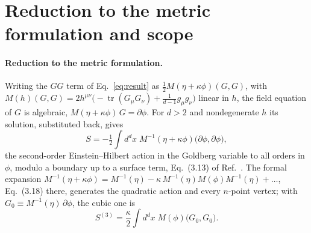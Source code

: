 \documentclass[prd,aps,preprint,superscriptaddress,nofootinbib,amsmath,amssymb,eqsecnum]{revtex4-2}
\providecommand{\DIFaddtex}[1]{{\protect\color{blue} \sf #1}} %
\providecommand{\DIFdeltex}[1]{{\protect\color{red} \scriptsize #1}} %
\providecommand{\DIFaddbegin}{} %
\providecommand{\DIFaddend}{} %
\providecommand{\DIFdelbegin}{} %
\providecommand{\DIFdelend}{} %
\providecommand{\DIFadd}[1]{\texorpdfstring{\DIFaddtex{#1}}{#1}} %
\providecommand{\DIFdel}[1]{\texorpdfstring{\DIFdeltex{#1}}{}} %
\begin{document}
\section{Reduction to the metric formulation and scope}
\label{sec:checks}

\paragraph{Reduction to the metric formulation.} Writing the $GG$ term of Eq.~\eqref{eq:result}
as $\tfrac12 M(\eta+\kappa\phi)(G,G)$, with
$M(h)(G,G)=2h^{\mu\nu}\big(-\operatorname{tr}(G_\mu G_\nu)+\tfrac{1}{d-1}g_\mu g_\nu\big)$
linear in $h$, the field equation of $G$ is algebraic, $M(\eta+\kappa\phi)\,G=\partial\phi$.
For $d>2$ and nondegenerate $h$ its solution, substituted back, gives
\begin{equation}
S=-\tfrac12\int d^dx\;M^{-1}(\eta+\kappa\phi)\big(\partial\phi,\partial\phi\big),
\label{eq:second}
\end{equation}
the second-order Einstein--Hilbert action in the Goldberg variable to all orders in $\phi$,
\DIFdelbegin \DIFdel{modulo a boundary }\DIFdelend \DIFaddbegin \DIFadd{up to a surface }\DIFaddend term, Eq.~(3.13) of Ref.~\cite{BrandtMcKeon2016}. The formal expansion
$M^{-1}(\eta+\kappa\phi)=M^{-1}(\eta)-\kappa\,M^{-1}(\eta)M(\phi)M^{-1}(\eta)+\dots$,
Eq.~(3.18) there, generates the quadratic action and every $n$-point vertex; with
$G_0\equiv M^{-1}(\eta)\,\partial\phi$, the cubic one is
\begin{equation}
S^{(3)}=\frac{\kappa}{2}\int d^dx\;M(\phi)\big(G_0,G_0\big).
\label{eq:cubicvertex}
\end{equation}
\end{document}
